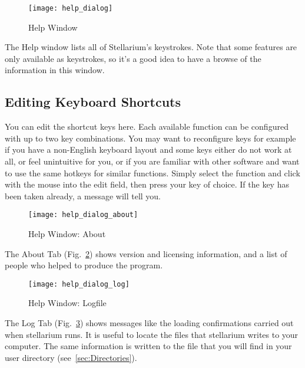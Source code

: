 \begin{figure}[htbp]
\centering\texttt{[image: help\_dialog]}
\caption{Help Window}
\label{fig:gui:help}
\end{figure}

\noindent The Help window lists all of Stellarium's keystrokes. Note that some
features are only available as keystrokes, so it's a good idea to have
a browse of the information in this window.

\subsection{Editing Keyboard Shortcuts}
\label{sec:gui:help:hotkeys}

You can edit the shortcut keys here. Each available function can be
configured with up to two key combinations. You may want to
reconfigure keys for example if you have a non-English keyboard layout
and some keys either do not work at all, or feel unintuitive for you,
or if you are familiar with other software and want to use the same
hotkeys for similar functions. Simply select the function and click
with the mouse into the edit field, then press your key of choice. If
the key has been taken already, a message will tell you.


\begin{figure}[htbp]
\centering\texttt{[image: help\_dialog\_about]}
\caption{Help Window: About}
\label{fig:gui:help:about}
\end{figure}

The About Tab (Fig.~\ref{fig:gui:help:about}) shows version and licensing information, and a list
of people who helped to produce the program.

\begin{figure}[htbp]
\centering\texttt{[image: help\_dialog\_log]}
\caption{Help Window: Logfile}
\label{fig:gui:help:log}
\end{figure}

The Log Tab (Fig.~\ref{fig:gui:help:log}) shows messages like the loading confirmations carried out when
stellarium runs. It is useful to locate the files that stellarium writes
to your computer. The same information is written to  the file  that you will
find in your user directory (see~\ref{sec:Directories}).




